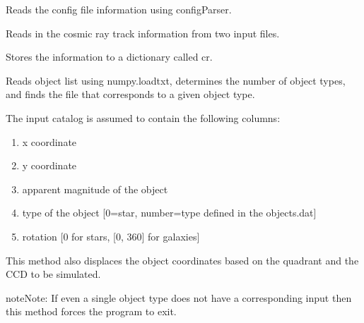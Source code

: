 \documentclass[a4paper,12pt,english]{sphinxmanual}
\begin{document}
\begin{fulllineitems}
\begin{fulllineitems}
\label{simulator:simulator.simulator.VISsimulator.readConfigs}
Reads the config file information using configParser.

\end{fulllineitems}


\begin{fulllineitems}
\label{simulator:simulator.simulator.VISsimulator.readCosmicRayInformation}
Reads in the cosmic ray track information from two input files.

Stores the information to a dictionary called cr.

\end{fulllineitems}


\begin{fulllineitems}
\label{simulator:simulator.simulator.VISsimulator.readObjectlist}
Reads object list using numpy.loadtxt, determines the number of object types,
and finds the file that corresponds to a given object type.

The input catalog is assumed to contain the following columns:
\begin{enumerate}
\item {} 
x coordinate

\item {} 
y coordinate

\item {} 
apparent magnitude of the object

\item {} 
type of the object {[}0=star, number=type defined in the objects.dat{]}

\item {} 
rotation {[}0 for stars, {[}0, 360{]} for galaxies{]}

\end{enumerate}

This method also displaces the object coordinates based on the quadrant and the
CCD to be simulated.

\begin{notice}{note}{Note:}
If even a single object type does not have a corresponding input then this method
forces the program to exit.
\end{notice}


\end{fulllineitems}
\end{fulllineitems}
\end{document}
